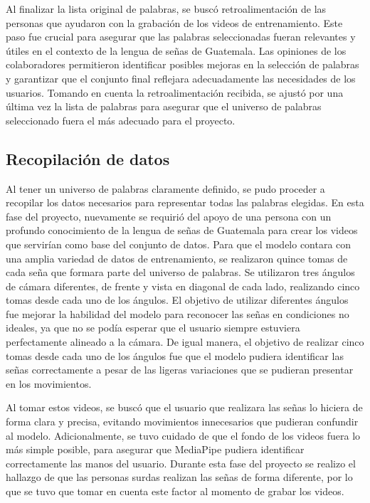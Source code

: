 Al finalizar la lista original de palabras, se buscó retroalimentación de las personas que ayudaron con la grabación de los videos de entrenamiento.
Este paso fue crucial para asegurar que las palabras seleccionadas fueran relevantes y útiles en el contexto de la lengua de señas de Guatemala.
Las opiniones de los colaboradores permitieron identificar posibles mejoras en la selección de palabras y garantizar que el conjunto final reflejara adecuadamente las necesidades de los usuarios.
Tomando en cuenta la retroalimentación recibida, se ajustó por una última vez la lista de palabras para asegurar que el universo de palabras seleccionado fuera el más adecuado para el proyecto.

\subsection{Recopilación de datos}
Al tener un universo de palabras claramente definido, se pudo proceder a recopilar los datos necesarios para representar todas las palabras elegidas.  
En esta fase del proyecto, nuevamente se requirió del apoyo de una persona con un profundo conocimiento de la lengua de señas de Guatemala para crear los videos que servirían como base del conjunto de datos.  
Para que el modelo contara con una amplia variedad de datos de entrenamiento, se realizaron quince tomas de cada seña que formara parte del universo de palabras.  
Se utilizaron tres ángulos de cámara diferentes, de frente y vista en diagonal de cada lado, realizando cinco tomas desde cada uno de los ángulos.  
El objetivo de utilizar diferentes ángulos fue mejorar la habilidad del modelo para reconocer las señas en condiciones no ideales, ya que no se podía esperar que el usuario siempre estuviera perfectamente alineado a la cámara.  
De igual manera, el objetivo de realizar cinco tomas desde cada uno de los ángulos fue que el modelo pudiera identificar las señas correctamente a pesar de las ligeras variaciones que se pudieran presentar en los movimientos.  

Al tomar estos videos, se buscó que el usuario que realizara las señas lo hiciera de forma clara y precisa, evitando movimientos innecesarios que pudieran confundir al modelo.
Adicionalmente, se tuvo cuidado de que el fondo de los videos fuera lo más simple posible, para asegurar que MediaPipe pudiera identificar correctamente las manos del usuario.
Durante esta fase del proyecto se realizo el hallazgo de que las personas surdas realizan las señas de forma diferente, por lo que se tuvo que tomar en cuenta este factor al momento de grabar los videos.


